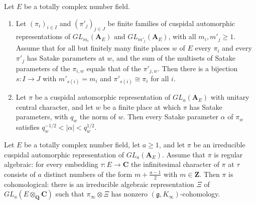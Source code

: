 \begin{theorem}\label{lit-jacquet-shalika}
Let $E$ be a totally complex number field.
\begin{enumerate}
\item Let $(\pi_i)_{i\in I}$ and $(\pi'_j)_{j\in J}$ be finite families of
  cuspidal automorphic representations of $GL_{m_i}(\mathbf A_E)$ and
  $GL_{m'_j}(\mathbf A_E)$, with all $m_i,m'_j\ge1$. Assume that for all but
  finitely many finite places $w$ of $E$ every $\pi_i$ and every $\pi'_j$ has
  Satake parameters at $w$, and the sum of the multisets of Satake parameters
  of the $\pi_{i,w}$ equals that of the $\pi'_{j,w}$. Then there is a bijection
  $s:I\to J$ with $m'_{s(i)}=m_i$ and $\pi'_{s(i)}\cong\pi_i$ for all $i$.
\item Let $\pi$ be a cuspidal automorphic representation of
  $GL_a(\mathbf A_E)$ with unitary central character, and let $w$ be a finite
  place at which $\pi$ has Satake parameters, with $q_w$ the norm of $w$.
  Then every Satake parameter $\alpha$ of $\pi_w$ satisfies
  $q_w^{-1/2}<|\alpha|<q_w^{1/2}$.
\end{enumerate}
\end{theorem}

\begin{theorem}\label{lit-clozel-cohomological}
Let $E$ be a totally complex number field, let $a\ge1$, and let $\pi$ be an
irreducible cuspidal automorphic representation of $GL_a(\mathbf A_E)$. Assume
that $\pi$ is regular algebraic: for every embedding $\tau:E\to\mathbf C$ the
infinitesimal character of $\pi$ at $\tau$ consists of $a$ distinct numbers of
the form $m+\frac{a-1}2$ with $m\in\mathbf Z$. Then $\pi$ is cohomological:
there is an irreducible algebraic representation $\Xi$ of
$GL_a(E\otimes_{\mathbf Q}\mathbf C)$ such that $\pi_\infty\otimes\Xi$ has
nonzero $(\mathfrak g,K_\infty)$-cohomology.
\end{theorem}

